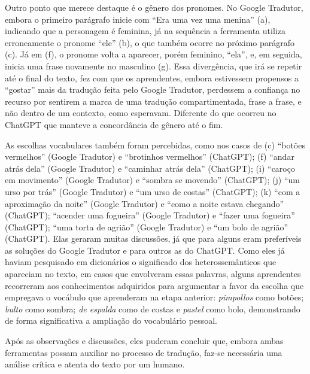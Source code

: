 \documentclass[portuguese]{textolivre}
\begin{document}
Outro ponto que merece destaque é o gênero dos pronomes. No Google Tradutor, embora o primeiro parágrafo inicie com “Era uma vez uma menina” (a), indicando que a personagem é feminina, já na sequência a ferramenta utiliza erroneamente o pronome “ele” (b), o que também ocorre no próximo parágrafo (c). Já em (f), o pronome volta a aparecer, porém feminino, “ela”, e, em seguida, inicia uma frase novamente no masculino (g). Essa divergência, que irá se repetir até o final do texto, fez com que os aprendentes, embora estivessem propensos a “gostar” mais da tradução feita pelo Google Tradutor, perdessem a confiança no recurso por sentirem a marca de uma tradução compartimentada, frase a frase, e não dentro de um contexto, como esperavam. Diferente do que ocorreu no ChatGPT que manteve a concordância de gênero até o fim.

As escolhas vocabulares também foram percebidas, como nos casos de (c) “botões vermelhos” (Google Tradutor) e “brotinhos vermelhos” (ChatGPT); (f) “andar atrás dela” (Google Tradutor) e “caminhar atrás dela” (ChatGPT); (i) “caroço em movimento” (Google Tradutor) e “sombra se movendo” (ChatGPT); (j) “um urso por trás” (Google Tradutor) e “um urso de costas” (ChatGPT); (k) “com a aproximação da noite” (Google Tradutor) e “como a noite estava chegando” (ChatGPT); “acender uma fogueira” (Google Tradutor) e “fazer uma fogueira” (ChatGPT); “uma torta de agrião” (Google Tradutor) e “um bolo de agrião” (ChatGPT). Elas geraram muitas discussões, já que para alguns eram preferíveis as soluções do Google Tradutor e para outros as do ChatGPT. Como eles já haviam pesquisado em dicionários o significado dos heterossemânticos que apareciam no texto, em casos que envolveram essas palavras, alguns aprendentes recorreram aos conhecimentos adquiridos para argumentar a favor da escolha que empregava o vocábulo que aprenderam na etapa anterior: \textit{pimpollos} como botões; \textit{bulto} como sombra; \textit{de espalda} como de costas e \textit{pastel} como bolo, demonstrando de forma significativa a ampliação do vocabulário pessoal.

Após as observações e discussões, eles puderam concluir que, embora ambas ferramentas possam auxiliar no processo de tradução, faz-se necessária uma análise crítica e atenta do texto por um humano.
\end{document}
